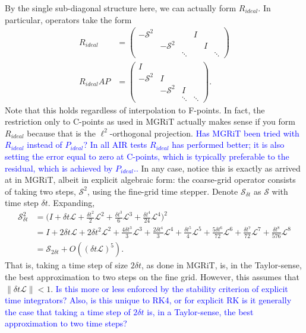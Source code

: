 \documentclass[a4paper,12pt]{article}
\newcommand{\tcb}{\textcolor{blue}}
\begin{document}
By the single sub-diagonal structure here, we can actually form $R_{ideal}$. In particular, operators take the form
%
\begin{align}
R_{ideal} & = \begin{pmatrix}-\mathcal{S}^2 & & & I & \\ & -\mathcal{S}^2 & & & I \\ & & \ddots & & & \ddots\end{pmatrix} \label{eq:ridealS}\\
R_{ideal}AP & = \begin{pmatrix} I \\ -\mathcal{S}^2 & I \\ & -\mathcal{S}^2 & I \\ & & \ddots & \ddots \end{pmatrix}.\label{eq:rapS}
\end{align}
%
Note that this holds regardless of interpolation to F-points. In fact, the restriction only to C-points as used in MGRiT actually makes
sense if you form $R_{ideal}$ because that is the $\ell^2$-orthogonal projection. \tcb{Has MGRiT been tried with $R_{ideal}$ instead
of $P_{ideal}$? In all AIR tests $R_{ideal}$ has performed better; it is also setting the error equal to zero at C-points, which is typically preferable
to the residual, which is achieved by $P_{ideal}$..} In any case, notice this is exactly as arrived at in
MGRiT, albeit in explicit algebraic form: the coarse-grid operator consists of taking two steps, $\mathcal{S}^2$, using the fine-grid
time stepper. Denote $\mathcal{S}_{\delta t}$ as $\mathcal{S}$ with time step $\delta t$. Expanding, 
%
\begin{align*}
\mathcal{S}_{\delta t}^2 & = \Big( I + \delta t\mathcal{L} + \tfrac{\delta t^2}{2}\mathcal{L}^2 + \tfrac{\delta t^3}{6}\mathcal{L}^3 +
	\tfrac{\delta t^4}{24}\mathcal{L}^4\Big)^2 \\
& = I + 2 \delta t \mathcal{L} + 2 \delta t^2\mathcal{L}^2 +  \tfrac{4\delta t^3}{3}\mathcal{L}^3 + \tfrac{2\delta t^4}{3}\mathcal{L}^4 + \tfrac{\delta t^5}{4}\mathcal{L}^5 + \tfrac{5\delta t^6}{72}\mathcal{L}^6 + \tfrac{\delta t^7}{72}\mathcal{L}^7 + \tfrac{\delta t^8}{576} \mathcal{L}^8 \\
& = \mathcal{S}_{2\delta t} + O((\delta t\mathcal{L})^5).
\end{align*}
%
That is, taking a time step of size $2\delta t$, as done in MGRiT, is, in the Taylor-sense, the best approximation to two steps on 
the fine grid. However, this assumes that $\|\delta t\mathcal{L}\| < 1$. \tcb{Is this more or less enforced by the stability criterion
of explicit time integrators? Also, is this unique to RK4, or for explicit RK is it generally the case that taking a time step of $2\delta t$
is, in a Taylor-sense, the best approximation to two time steps?}
\end{document}
